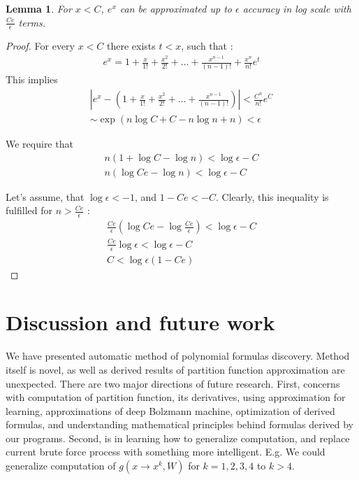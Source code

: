 \documentclass{article}
\newtheorem{lemma}[theorem]{Lemma}
\begin{document}
\begin{lemma}
	For $x < C$, $e^x$ can be approximated up to $\epsilon$ accuracy in log scale with $\frac{Ce}{\epsilon}$ terms. 
\end{lemma}
\begin{proof}

For every $x < C$ there exists $t < x$, such that :  
\begin{align*}
	e^x = 1 + \frac{x}{1!} + \frac{x^2}{2!} + \dots + \frac{x^{n - 1}}{(n - 1)!} + \frac{x^n}{n!}e^t
\end{align*}
This implies
\begin{align*}
	|e^x - (1 + \frac{x}{1!} + \frac{x^2}{2!} + \dots + \frac{x^{n - 1}}{(n - 1)!}) | < \frac{C^n}{n!}e^C \\
	\sim \exp(n\log{C} + C - n\log{n} + n) < \epsilon
\end{align*}

We require that 
\begin{align*}
	n (1 + \log{C} - \log{n}) < \log{\epsilon} - C \\ 
	n (\log{Ce} - \log{n}) < \log{\epsilon} - C
\end{align*}

Let's assume, that $\log{\epsilon} < -1$, and $1 - Ce < -C$. 
Clearly, this inequality is fulfilled for $n > \frac{Ce}{\epsilon}$ :
\begin{align*}
	\frac{Ce}{\epsilon} (\log{Ce} - \log{\frac{Ce}{\epsilon}}) < \log{\epsilon} - C \\
	\frac{Ce}{\epsilon} \log{\epsilon} < \log{\epsilon} - C\\
	C < \log{\epsilon}(1 - Ce)
\end{align*}


\end{proof}


\section{Discussion and future work}
We have presented automatic method of polynomial formulas discovery. Method itself is novel, as well 
as derived results of partition function approximation are unexpected.
There are two major directions of future research. First, concerns with computation of partition function,
its derivatives, using approximation for learning, 
approximations of deep Bolzmann machine, optimization of derived formulas, and 
understanding mathematical principles behind formulas derived by our programs. Second, is in 
learning how to generalize computation, and replace current brute force process with something more
intelligent. E.g. We could generalize computation of $g(x \rightarrow x^k, W)$ for $k = 1, 2, 3, 4$ to
$k > 4$. 


\nocite{*}


\end{document}
